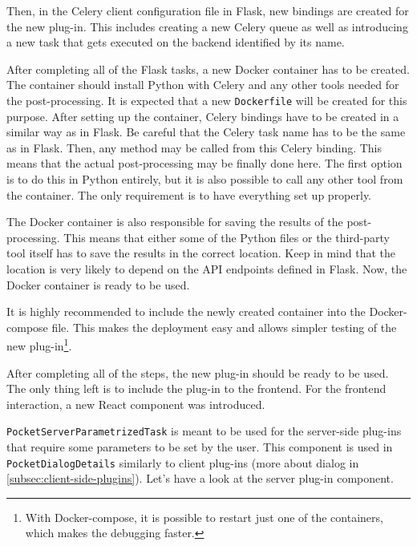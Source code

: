 Then, in the Celery client configuration file in Flask, new bindings are created for the new plug-in. This includes creating a new Celery queue as well as introducing a new task that gets executed on the backend identified by its name.

After completing all of the Flask tasks, a new Docker container has to be created. The container should install Python with Celery and any other tools needed for the post-processing. It is expected that a new \texttt{Dockerfile} will be created for this purpose. After setting up the container, Celery bindings have to be created in a similar way as in Flask. Be careful that the Celery task name has to be the same as in Flask. Then, any method may be called from this Celery binding. This means that the actual post-processing may be finally done here. The first option is to do this in Python entirely, but it is also possible to call any other tool from the container. The only requirement is to have everything set up properly. 

The Docker container is also responsible for saving the results of the post-processing. This means that either some of the Python files or the third-party tool itself has to save the results in the correct location. Keep in mind that the location is very likely to depend on the API endpoints defined in Flask. Now, the Docker container is ready to be used.

It is highly recommended to include the newly created container into the Docker-compose file. This makes the deployment easy and allows simpler testing of the new plug-in\footnote{With Docker-compose, it is possible to restart just one of the containers, which makes the debugging faster.}.

After completing all of the steps, the new plug-in should be ready to be used. The only thing left is to include the plug-in to the frontend. For the frontend interaction, a new React component was introduced.

\texttt{PocketServerParametrizedTask} is meant to be used for the server-side plug-ins that require some parameters to be set by the user. This component is used in \texttt{PocketDialogDetails} similarly to client plug-ins (more about dialog in \cref{subsec:client-side-plugins}). Let's have a look at the server plug-in component.



